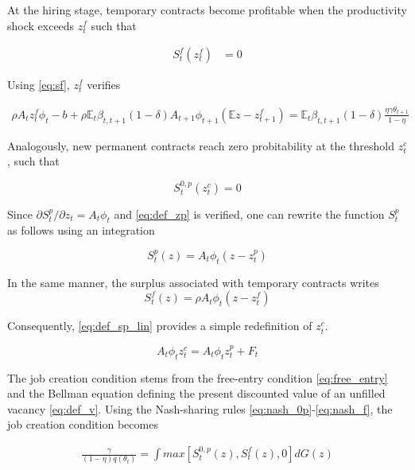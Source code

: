 At the hiring stage, temporary contracts become profitable when the productivity shock exceeds $z_t^f$ such that

\begin{align*}
S_t^{f} \left( z_t^f \right) &= 0
\end{align*}

Using \eqref{eq:sf}, $z_t^f$ verifies

\begin{align} \label{eq:zf}
\rho A_t z_t^f \phi_t - b + \rho \mathbb{E}_t \beta_{t,t+1} (1-\delta) A_{t+1} \phi_{t+1} \left( \mathbb{E}z - z_{t+1}^f \right) = \mathbb{E}_t \beta_{t,t+1} (1-\delta) \frac{\eta \gamma \theta_{t+1}}{1-\eta}
\end{align}

Analogously, new permanent contracts reach zero probitability at the threshold $z_t^c$, such that

\begin{equation*}
S_t^{0,p} \left( z_t^c \right) = 0
\end{equation*}

Since $\partial S_t^p / \partial z_t = A_t \phi_t$ and \eqref{eq:def_zp} is verified, one can rewrite the function $S_t^p$ as follows using an integration

\begin{equation} \label{eq:def_sp_lin}
S_t^p (z) = A_t \phi_t \left( z - z_t^p \right)
\end{equation}

In the same manner, the surplus associated with temporary contracts writes
\begin{equation} \label{eq:def_sf_lin}
S_t^f (z) = \rho A_t \phi_t \left( z - z_t^f \right)
\end{equation}

Consequently, \eqref{eq:def_sp_lin} provides a simple redefinition of $z_t^c$.

\begin{equation}
A_t \phi_t z_t^c = A_t \phi_t z_t^p + F_t \label{eq:zc}
\end{equation}

The job creation condition stems from the free-entry condition \eqref{eq:free_entry} and the Bellman equation defining the present discounted value of an unfilled vacancy \eqref{eq:def_v}. Using the Nash-sharing rules \eqref{eq:nash_0p}-\eqref{eq:nash_f}, the job creation condition becomes

\begin{align*}
\frac{\gamma}{(1-\eta) q\left( \theta_t \right)} = \int max \left[ S_t^{0,p} \left( z \right) , S_t^{f} \left( z \right), 0\right] dG(z)
\end{align*}



